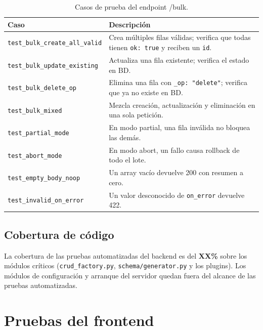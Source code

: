 \begin{table}[H]
  \centering
  \caption{Casos de prueba del endpoint /bulk.}
  \label{tab:tests-bulk}
  \begin{tabular}{lp{8.5cm}}
    \toprule
    \textbf{Caso} & \textbf{Descripción} \\
    \midrule
    \texttt{test\_bulk\_create\_all\_valid} & Crea múltiples filas válidas; verifica
      que todas tienen \texttt{ok: true} y reciben un \texttt{id}. \\
    \texttt{test\_bulk\_update\_existing} & Actualiza una fila existente; verifica el
      estado en BD. \\
    \texttt{test\_bulk\_delete\_op} & Elimina una fila con \texttt{\_op: "delete"};
      verifica que ya no existe en BD. \\
    \texttt{test\_bulk\_mixed} & Mezcla creación, actualización y eliminación en una
      sola petición. \\
    \texttt{test\_partial\_mode} & En modo partial, una fila inválida no bloquea las
      demás. \\
    \texttt{test\_abort\_mode} & En modo abort, un fallo causa rollback de todo el
      lote. \\
    \texttt{test\_empty\_body\_noop} & Un array vacío devuelve 200 con resumen a cero. \\
    \texttt{test\_invalid\_on\_error} & Un valor desconocido de \texttt{on\_error}
      devuelve 422. \\
    \bottomrule
  \end{tabular}
\end{table}

\subsection{Cobertura de código}
\label{subsec:cobertura}


La cobertura de las pruebas automatizadas del backend es del \textbf{XX\%} sobre los
módulos críticos (\texttt{crud\_factory.py}, \texttt{schema/generator.py} y los plugins).
Los módulos de configuración y arranque del servidor quedan fuera del alcance de las
pruebas automatizadas.

\section{Pruebas del frontend}
\label{sec:pruebas-frontend}

